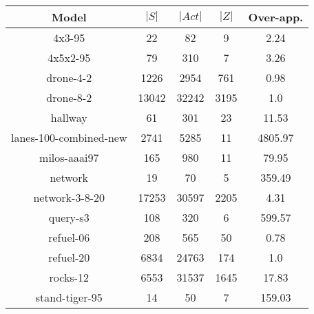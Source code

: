 \begin{table}
\begin{tabular}{|c|ccc|c|}
\hline

Model & $|S|$ & $|Act|$ & $|Z|$ & Over-app. \\ \hline 

4x3-95 & 22 & 82 & 9 & 2.24 \\
4x5x2-95 & 79 & 310 & 7 & 3.26 \\
drone-4-2 & 1226 & 2954 & 761 & 0.98 \\
drone-8-2 & 13042 & 32242 & 3195 & 1.0 \\
hallway & 61 & 301 & 23 & 11.53 \\
lanes-100-combined-new & 2741 & 5285 & 11 & 4805.97 \\
milos-aaai97 & 165 & 980 & 11 & 79.95 \\
network & 19 & 70 & 5 & 359.49 \\
network-3-8-20 & 17253 & 30597 & 2205 & 4.31 \\
query-s3 & 108 & 320 & 6 & 599.57 \\
refuel-06 & 208 & 565 & 50 & 0.78 \\
refuel-20 & 6834 & 24763 & 174 & 1.0 \\
rocks-12 & 6553 & 31537 & 1645 & 17.83 \\
stand-tiger-95 & 14 & 50 & 7 & 159.03 \\
\hline
\end{tabular}
\end{table}

